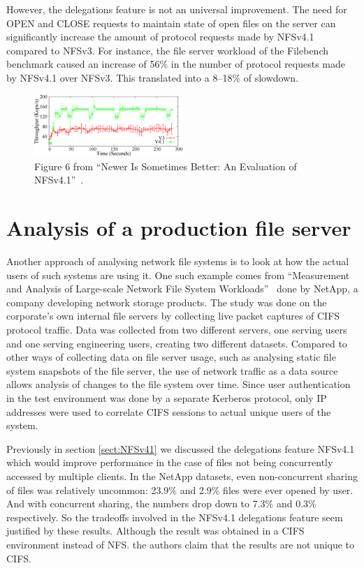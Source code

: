 However, the delegations feature is not an universal improvement.
The need for OPEN and CLOSE requests to maintain state of open files on the server can significantly increase the amount of protocol requests made by NFSv4.1 compared to NFSv3.
For instance, the file server workload of the Filebench benchmark caused an increase of 56\% in the number of protocol requests made by NFSv4.1 over NFSv3.
This translated into a 8--18\% of slowdown.

\begin{figure}[h]
\centering\includegraphics[width=0.5\textwidth]{images/nfsv41better-reading-small-files.png}
\caption{Figure 6 from ``Newer Is Sometimes Better: An Evaluation of NFSv4.1''~\cite{NFSv4Better}.}
\label{fig:nfsv41randread}
\end{figure}

\section{Analysis of a production file server}

Another approach of analysing network file systems is to look at how the actual users of such systems are using it.
One such example comes from ``Measurement and Analysis of Large-scale Network File System Workloads''~\cite{NetApp} done by NetApp,
a company developing network storage products.
The study was done on the corporate's own internal file servers by collecting live packet captures of CIFS protocol traffic.
Data was collected from two different servers, one serving users and one serving engineering users, creating two different datasets.
Compared to other ways of collecting data on file server usage, such as analysing static file system snapshots of the file server,
the use of network traffic as a data source allows analysis of changes to the file system over time.
Since user authentication in the test environment was done by a separate Kerberos protocol,
only IP addresses were used to correlate CIFS sessions to actual unique users of the system.

Previously in section \ref{sect:NFSv41} we discussed the delegations feature NFSv4.1 which would improve performance in the case of files not being concurrently accessed by multiple clients.
In the NetApp datasets, even non-concurrent sharing of files was relatively uncommon: 23.9\% and 2.9\% files were ever opened by user.
And with concurrent sharing, the numbers drop down to 7.3\% and 0.3\% respectively.
So the tradeoffs involved in the NFSv4.1 delegations feature seem justified by these results.
Although the result was obtained in a CIFS environment instead of NFS.
the authors claim that the results are not unique to CIFS.

